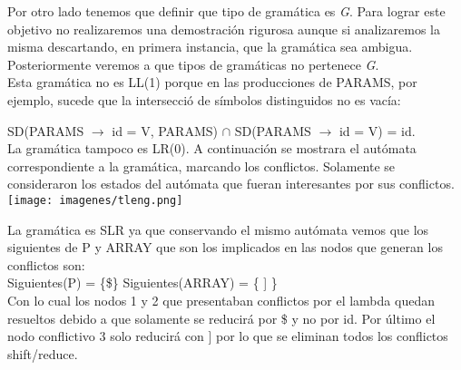 Por otro lado tenemos que definir que tipo de gramática es \textit{G}. Para lograr este objetivo no realizaremos una demostración rigurosa
aunque si analizaremos la misma descartando, en primera instancia, que la gramática sea ambigua. Posteriormente veremos a que tipos de gramáticas no pertenece \textit{G}.\\

Esta gramática no es LL(1) porque en las producciones de PARAMS, por ejemplo, sucede que la intersecci\'o de s\'imbolos distinguidos no es vac\'ia:

SD(PARAMS $\rightarrow$ id = V, PARAMS) $\cap$ SD(PARAMS $\rightarrow$ id = V) = {id}.\\

La gramática tampoco es LR(0). A continuación se mostrara el autómata correspondiente a la gramática, marcando los conflictos.
Solamente se consideraron los estados del autómata que fueran interesantes por sus conflictos.\\

\texttt{[image: imagenes/tleng.png]}


La gramática es SLR ya que conservando el mismo autómata vemos que los siguientes de P y ARRAY que son los implicados en
las nodos que generan los conflictos son:\\

Siguientes(P) = \{\$\}
Siguientes(ARRAY) = \{ ] \}\\

Con lo cual los nodos 1 y 2 que presentaban conflictos por el lambda quedan resueltos debido a que solamente se reducirá por
\$ y no por id. Por último el nodo conflictivo 3 solo reducirá con ] por lo que se eliminan todos los conflictos shift/reduce.

